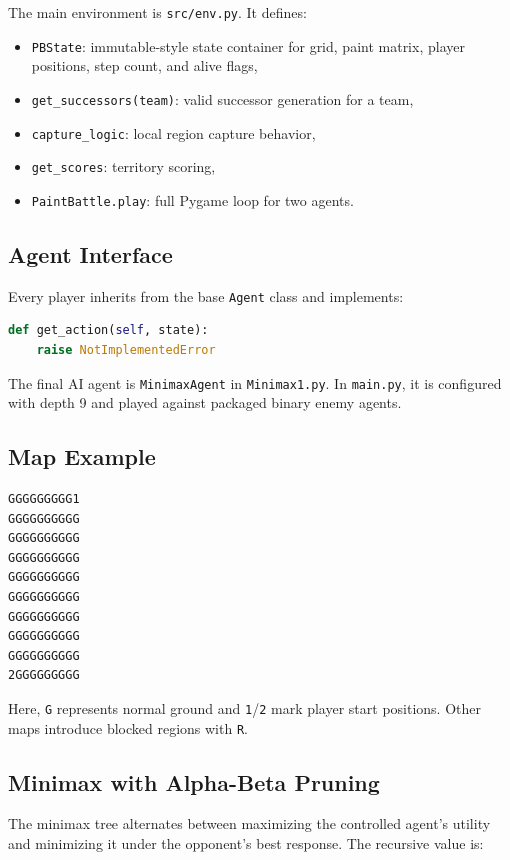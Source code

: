 \documentclass[11pt,a4paper]{article}
\newcommand{\code}[1]{\texttt{#1}}
\begin{document}
The main environment is \code{src/env.py}. It defines:

\begin{itemize}[leftmargin=*]
    \item \code{PBState}: immutable-style state container for grid, paint matrix, player positions, step count, and alive flags,
    \item \code{get\_successors(team)}: valid successor generation for a team,
    \item \code{capture\_logic}: local region capture behavior,
    \item \code{get\_scores}: territory scoring,
    \item \code{PaintBattle.play}: full Pygame loop for two agents.
\end{itemize}

\subsection{Agent Interface}

Every player inherits from the base \code{Agent} class and implements:

\begin{lstlisting}[language=Python]
def get_action(self, state):
    raise NotImplementedError
\end{lstlisting}

The final AI agent is \code{MinimaxAgent} in \code{Minimax1.py}. In \code{main.py}, it is configured with depth 9 and played against packaged binary enemy agents.

\subsection{Map Example}

\begin{lstlisting}
GGGGGGGGG1
GGGGGGGGGG
GGGGGGGGGG
GGGGGGGGGG
GGGGGGGGGG
GGGGGGGGGG
GGGGGGGGGG
GGGGGGGGGG
GGGGGGGGGG
2GGGGGGGGG
\end{lstlisting}

Here, \code{G} represents normal ground and \code{1}/\code{2} mark player start positions. Other maps introduce blocked regions with \code{R}.

\subsection{Minimax with Alpha-Beta Pruning}

The minimax tree alternates between maximizing the controlled agent's utility and minimizing it under the opponent's best response. The recursive value is:
\end{document}
